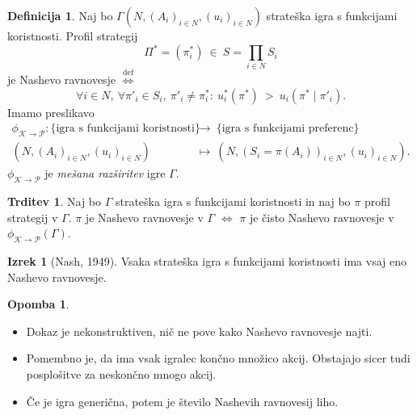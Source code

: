 \documentclass[11pt]{article}
\newcommand{\diff}{\overset{\text{def}}{\iff}}
\newcommand{\set}[1]{\{#1\}}
\theoremstyle{definition}
\newtheorem{definicija}{Definicija}[section]
\theoremstyle{definition}
\newtheorem{trditev}{Trditev}[section]
\theoremstyle{definition}
\newtheorem{izrek}{Izrek}[section]
\theoremstyle{definition}
\newtheorem*{opomba}{Opomba}
\begin{document}
\begin{definicija}

Naj bo $\Gamma(N, (A_i)_{i \in N}, (u_i)_{i \in N})$ strateška igra s funkcijami koristnosti. Profil strategij 
$$\Pi^* = (\pi_i^*) ~\in~ S = \prod_{i \in N} S_i$$
je Nashevo ravnovesje $\diff$
$$\forall i \in N, ~\forall \pi'_i \in S_i, ~\pi'_i \neq \pi_i^*: ~u_i^*(\pi^*) ~>~ u_i(\pi^* \mid \pi'_i).$$
Imamo preslikavo
\begin{align*}
\phi_{\mathscr{K} \rightarrow \mathscr{P}}: \set{\text{igra s funkcijami koristnosti}} ~&\rightarrow~ \set{\text{igra s funkcijami preferenc}} \\
(N, (A_i)_{i \in N}, (u_i)_{i \in N}) ~&\mapsto~ (N, (S_i = \pi(A_i))_{i \in N}, (u_i)_{i \in N}).
\end{align*}
$\phi_{\mathscr{K} \rightarrow \mathscr{P}}$ je \textit{mešana razširitev} igre $\Gamma$.

\end{definicija}
\vspace{0.5cm}

\begin{trditev}

Naj bo $\Gamma$ strateška igra s funkcijami koristnosti in naj bo $\pi$ profil strategij v $\Gamma$. $\pi$ je Nashevo ravnovesje v $\Gamma$ $\iff$ $\pi$ je čisto Nashevo ravnovesje v $\phi_{\mathscr{K} \rightarrow \mathscr{P}}(\Gamma)$.

\end{trditev}
\vspace{0.5cm}

\begin{izrek}[Nash, 1949]

Vsaka strateška igra s funkcijami koristnosti ima vsaj eno Nashevo ravnovesje.

\end{izrek}
\vspace{0.5cm}

\begin{opomba}
~
\begin{itemize}
	\item Dokaz je nekonstruktiven, nič ne pove kako Nashevo ravnovesje najti.
	\item Pomembno je, da ima vsak igralec končno množico akcij. Obstajajo sicer tudi posplošitve za neskončno mnogo akcij.
	\item Če je igra generična, potem je število Nashevih ravnovesij liho.
\end{itemize}

\end{opomba}
\vspace{0.5cm}
\end{document}
